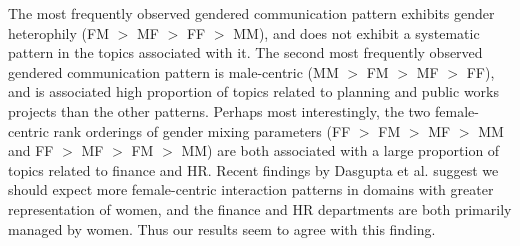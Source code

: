 \documentclass{pnastwo}
\begin{document}
\begin{article}
The most frequently observed gendered communication pattern exhibits gender heterophily (FM $>$  MF $>$ FF $>$ MM), and does not exhibit a systematic pattern in the topics associated with it. The second most frequently observed gendered communication pattern is male-centric (MM $>$ FM $>$ MF $>$ FF), and is associated high proportion of topics related to planning and public works projects than the other patterns. Perhaps most interestingly, the two female-centric rank orderings of gender mixing parameters (FF $>$ FM $>$ MF $>$ MM and FF $>$ MF $>$ FM $>$ MM) are both associated with a large proportion of topics related to finance and HR. Recent findings by Dasgupta et al. \cite{Dasgupta2015} suggest we should expect more female-centric interaction patterns in domains with greater representation of women, and the finance and HR departments are both primarily managed by women. Thus our results seem to agree with this finding.




\end{article}
\end{document}
